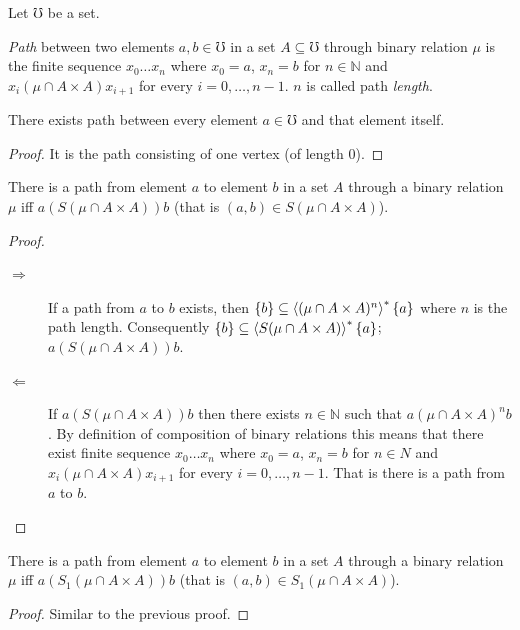 Let $\mho$ be a set.
\begin{defn}
\emph{Path} between two elements $a,b\in\mho$ in a set
$A\subseteq\mho$ through binary relation $\mu$ is the finite sequence
$x_{0}\ldots x_{n}$ where $x_{0}=a$, $x_{n}=b$ for $n\in\mathbb{N}$
and $x_{i}\mathrel{(\mu\cap A\times A)}x_{i+1}$ for every $i=0,\ldots,n-1$.
$n$ is called path \emph{length}.\end{defn}
\begin{prop}
There exists path between every element $a\in\mho$ and that element
itself.\end{prop}
\begin{proof}
It is the path consisting of one vertex (of length $0$).\end{proof}
\begin{prop}
There is a path from element $a$ to element $b$ in a set $A$ through
a binary relation $\mu$ iff $a\mathrel{(S(\mu\cap A\times A))}b$
(that is $(a,b)\in S(\mu\cap A\times A)$).\end{prop}
\begin{proof}
~
\begin{description}
\item [{$\Rightarrow$}] If a path from $a$ to $b$ exists, then $\{b\}\subseteq\left\langle (\mu\cap A\times A)^{n}\right\rangle ^{\ast}\{a\}$
where $n$ is the path length. Consequently $\{b\}\subseteq\left\langle S(\mu\cap A\times A)\right\rangle ^{\ast}\{a\}$;
$a\mathrel{(S(\mu\cap A\times A))}b$.
\item [{$\Leftarrow$}] If $a\mathrel{(S(\mu\cap A\times A))}b$ then there
exists $n\in\mathbb{N}$ such that $a\mathrel{(\mu\cap A\times A)^{n}}b$.
By definition of composition of binary relations this means that there
exist finite sequence $x_{0}\ldots x_{n}$ where $x_{0}=a$, $x_{n}=b$
for $n\in\mathbb{}{N}$ and $x_{i}\mathrel{(\mu\cap A\times A)}x_{i+1}$
for every $i=0,\ldots,n-1$. That is there is a path from $a$ to
$b$.
\end{description}
\end{proof}
\begin{prop}
There is a path from element $a$ to element $b$ in a set $A$ through
a binary relation $\mu$ iff $a\mathrel{(S_1(\mu\cap A\times A))}b$
(that is $(a,b)\in S_1(\mu\cap A\times A)$).\end{prop}
\begin{proof}
Similar to the previous proof.
\end{proof}

